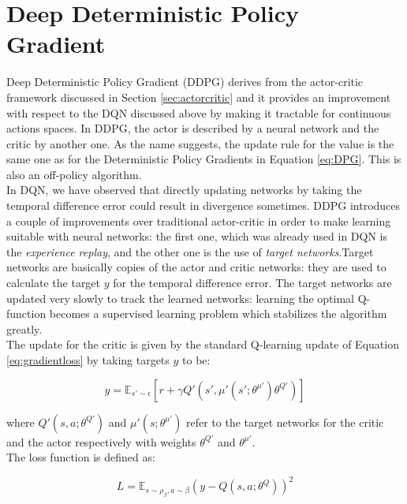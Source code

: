 \label{appendixB}

\section{Deep Deterministic Policy Gradient}
\label{sec:DDPG}
Deep Deterministic Policy Gradient (DDPG)\cite{lillicrap2015continuous} derives from the actor-critic framework discussed in Section \ref{sec:actorcritic} and it provides an improvement with respect to the DQN discussed above by making it tractable for continuous actions spaces. In DDPG, the actor is described by a neural network and the critic by another one. As the name suggests, the update rule for the value is the same one as for the Deterministic Policy Gradients in Equation \ref{eq:DPG}. This is also an off-policy algorithm.
\\
\indent In DQN, we have observed that directly updating networks by taking the temporal difference error could result in divergence sometimes. DDPG introduces a couple of improvements over traditional actor-critic in order to make learning suitable with neural networks: the first one, which was already used in DQN is the \textit{experience replay}, and the other one is the use of \textit{target networks}.Target networks are basically copies of the actor and critic networks: they are used to calculate the target $y$ for the temporal difference error. The target networks are updated very slowly to track the learned networks: learning the optimal Q-function becomes a supervised learning problem which stabilizes the algorithm greatly.
\\
\indent The update for the critic is given by the standard Q-learning update of Equation \ref{eq:gradientloss} by taking targets $y$ to be:

\begin{equation}
	\label{eq:criticupdate}
	y = \mathbb{E}_{s'\sim\epsilon}[r + \gamma Q'(s', \mu'(s'; \theta^{\mu'})\theta^{Q'})]
\end{equation}

where $Q'(s, a; \theta^{Q'})$ and $ \mu'(s; \theta^{\mu'})$ refer to the target networks for the critic and the actor respectively with weights $\theta^{Q'}$ and $\theta^{\mu'}$.
\\
\indent The loss function is defined as:

\begin{equation}
	\label{eq:lossactorcritic}
	L = \mathbb{E}_{s\sim\rho_\beta, a\sim\beta}\left(y-Q(s,a; \theta^Q)\right)^2
\end{equation}


